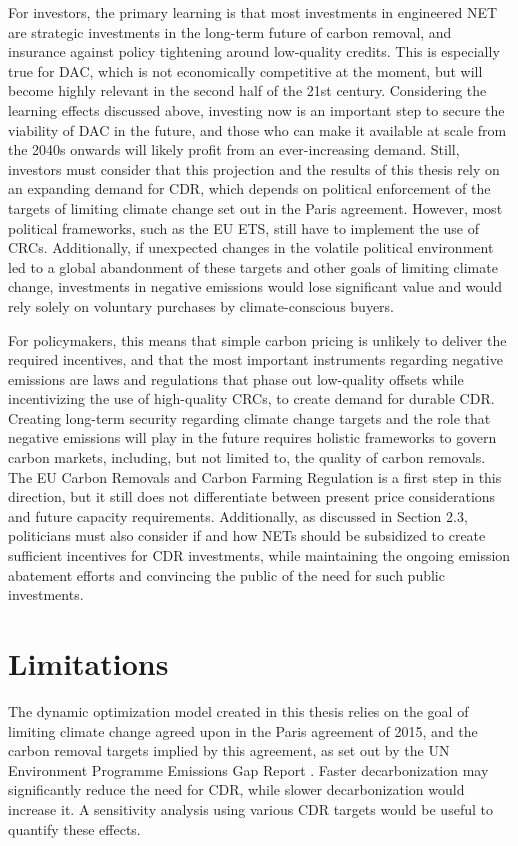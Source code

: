 For investors, the primary learning is that most investments in engineered NET are strategic investments in the long-term future of carbon removal, and insurance against policy tightening around low‑quality credits. This is especially true for DAC, which is not economically competitive at the moment, but will become highly relevant in the second half of the 21st century. Considering the learning effects discussed above, investing now is an important step to secure the viability of DAC in the future, and those who can make it available at scale from the 2040s onwards will likely profit from an ever-increasing demand. Still, investors must consider that this projection and the results of this thesis rely on an expanding demand for CDR, which depends on political enforcement of the targets of limiting climate change set out in the Paris agreement. However, most political frameworks, such as the EU ETS, still have to implement the use of CRCs. Additionally, if unexpected changes in the volatile political environment led to a global abandonment of these targets and other goals of limiting climate change, investments in negative emissions would lose significant value and would rely solely on voluntary purchases by climate-conscious buyers.\vspace{2mm}

For policymakers, this means that simple carbon pricing is unlikely to deliver the required incentives, and that the most important instruments regarding negative emissions are laws and regulations that phase out low-quality offsets while incentivizing the use of high-quality CRCs, to create demand for durable CDR. Creating long-term security regarding climate change targets and the role that negative emissions will play in the future requires holistic frameworks to govern carbon markets, including, but not limited to, the quality of carbon removals. The EU Carbon Removals and Carbon Farming Regulation is a first step in this direction, but it still does not differentiate between present price considerations and future capacity requirements. Additionally, as discussed in Section 2.3, politicians must also consider if and how NETs should be subsidized to create sufficient incentives for CDR investments, while maintaining the ongoing emission abatement efforts and convincing the public of the need for such public investments.

\section{Limitations}
The dynamic optimization model created in this thesis relies on the goal of limiting climate change agreed upon in the Paris agreement of 2015, and the carbon removal targets implied by this agreement, as set out by the UN Environment Programme Emissions Gap Report \parencite{unep_emissions_2017}. Faster decarbonization may significantly reduce the need for CDR, while slower decarbonization would increase it. A sensitivity analysis using various CDR targets would be useful to quantify these effects.\vspace{2mm}

